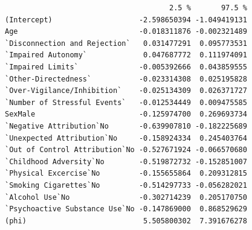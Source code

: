 \documentclass[
  letterpaper,
  DIV=11,
  numbers=noendperiod]{scrartcl}
\begin{document}
\begin{verbatim}
                                      2.5 %       97.5 %
(Intercept)                    -2.598650394 -1.049419131
Age                            -0.018311876 -0.002321489
`Disconnection and Rejection`   0.031477291  0.095773531
`Impaired Autonomy`             0.047687772  0.111974091
`Impaired Limits`              -0.005392666  0.043859555
`Other-Directedness`           -0.023314308  0.025195828
`Over-Vigilance/Inhibition`    -0.025134309  0.026371727
`Number of Stressful Events`   -0.012534449  0.009475585
SexMale                        -0.125974700  0.269693734
`Negative Attribution`No       -0.639907810 -0.182225689
`Unexpected Attribution`No     -0.158924334  0.245403764
`Out of Control Attribution`No -0.527671924 -0.066570680
`Childhood Adversity`No        -0.519872732 -0.152851007
`Physical Excercise`No         -0.155655864  0.209312815
`Smoking Cigarettes`No         -0.514297733 -0.056282021
`Alcohol Use`No                -0.302714239  0.205170750
`Psychoactive Substance Use`No -0.147869000  0.868529629
(phi)                           5.505800302  7.391676278
\end{verbatim}
\end{document}
